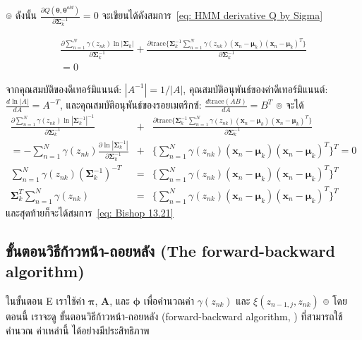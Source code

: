 ๏ ดังนั้น $\frac{\partial Q(\bm{\theta}, \bm{\theta}^{old})}{\partial \bm{\Sigma}_k^{-1}} = 0$ จะเขียนได้ดังสมการ~\ref{eq: HMM derivative Q by Sigma}

\begin{eqnarray}
\frac{\partial \sum_{n=1}^N \gamma (z_{nk}) \ln | \bm{\Sigma}_k |}{\partial \bm{\Sigma}_k^{-1}} +
\frac{\partial \mathrm{trace}\{ 
\bm{\Sigma}_k^{-1} \sum_{n=1}^N \gamma (z_{nk})(\textbf{x}_n - \bm{\mu}_k) (\textbf{x}_n - \bm{\mu}_k)^T \}}{\partial \bm{\Sigma}_k^{-1}}
\nonumber \\
= 0
\label{eq: HMM derivative Q by Sigma}
\end{eqnarray}


จากคุณสมบัติของดีเทอร์มิแนนต์: $|A^{-1}| = 1/|A|$, 
คุณสมบัติอนุพันธ์ของค่าดีเทอร์มิแนนต์: $\frac{d \ln |A|}{d A} = A^{-T}$,  
และคุณสมบัติอนุพันธ์ของรอยเมตริกซ์: $\frac{d \mathrm{trace}(A B)}{d A} = B^T$
๏ จะได้
\begin{eqnarray}
\frac{\partial \sum_{n=1}^N \gamma (z_{nk}) \ln |\bm{\Sigma}_k^{-1}|^{-1}}{\partial \bm{\Sigma}_k^{-1}} 
&+&
\frac{\partial \mathrm{trace}\{ 
\bm{\Sigma}_k^{-1} \sum_{n=1}^N \gamma (z_{nk})(\textbf{x}_n - \bm{\mu}_k) (\textbf{x}_n - \bm{\mu}_k)^T \}}{\partial \bm{\Sigma}_k^{-1}} 
\nonumber \\
=
-\sum_{n=1}^N \gamma (z_{nk}) \frac{\partial  \ln |\bm{\Sigma}_k^{-1}|}{\partial \bm{\Sigma}_k^{-1}} 
&+&
\{ 
\sum_{n=1}^N \gamma (z_{nk})(\textbf{x}_n - \bm{\mu}_k) (\textbf{x}_n - \bm{\mu}_k)^T \}^T
= 0
\nonumber \\
\sum_{n=1}^N \gamma (z_{nk}) (\bm{\Sigma}_k^{-1})^{-T} 
&=& \{
\sum_{n=1}^N \gamma (z_{nk})(\textbf{x}_n - \bm{\mu}_k) (\textbf{x}_n - \bm{\mu}_k)^T
\}^T
\nonumber \\
\bm{\Sigma}_k^{T} \sum_{n=1}^N \gamma (z_{nk})  
&=& \{
\sum_{n=1}^N \gamma (z_{nk})(\textbf{x}_n - \bm{\mu}_k) (\textbf{x}_n - \bm{\mu}_k)^T
\}^T
\nonumber
\end{eqnarray}
และสุดท้ายก็จะได้สมการ~\ref{eq: Bishop 13.21}
\\


\subsection{ขั้นตอนวิธีก้าวหน้า-ถอยหลัง (The forward-backward algorithm)}

ในขั้นตอน E เราใช้ค่า $\bm{\pi}$, $\bm{A}$, และ $\bm{\phi}$ เพื่อคำนวณค่า $\gamma (z_{nk})$ และ $\xi (z_{n-1,j}, z_{nk})$
๏ โดย ตอนนี้ เราจะดู ขั้นตอนวิธีก้าวหน้า-ถอยหลัง (forward-backward algorithm, \cite{Rabiner1989a}) ที่สามารถใช้ คำนวณ ค่าเหล่านี้ ได้อย่างมีประสิทธิภาพ


